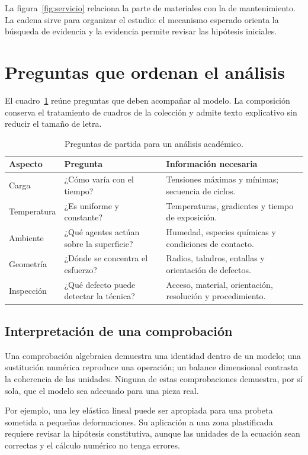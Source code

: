 La figura~\ref{fig:servicio} relaciona la parte de materiales con la de mantenimiento. La cadena sirve para organizar el estudio: el mecanismo esperado orienta la búsqueda de evidencia y la evidencia permite revisar las hipótesis iniciales.

\clearpage
\section{Preguntas que ordenan el análisis}
El cuadro~\ref{tab:preguntas} reúne preguntas que deben acompañar al modelo. La composición conserva el tratamiento de cuadros de la colección y admite texto explicativo sin reducir el tamaño de letra.

\begin{table}[htbp]
\centering\small
\caption{Preguntas de partida para un análisis académico.}\label{tab:preguntas}
\begin{tabular}{p{.23\linewidth}p{.31\linewidth}p{.35\linewidth}}
\toprule
Aspecto & Pregunta & Información necesaria\\
\midrule
Carga & ¿Cómo varía con el tiempo? & Tensiones máximas y mínimas; secuencia de ciclos.\\[4pt]
Temperatura & ¿Es uniforme y constante? & Temperaturas, gradientes y tiempo de exposición.\\[4pt]
Ambiente & ¿Qué agentes actúan sobre la superficie? & Humedad, especies químicas y condiciones de contacto.\\[4pt]
Geometría & ¿Dónde se concentra el esfuerzo? & Radios, taladros, entallas y orientación de defectos.\\[4pt]
Inspección & ¿Qué defecto puede detectar la técnica? & Acceso, material, orientación, resolución y procedimiento.\\
\bottomrule
\end{tabular}
\end{table}

\subsection{Interpretación de una comprobación}
Una comprobación algebraica demuestra una identidad dentro de un modelo; una sustitución numérica reproduce una operación; un balance dimensional contrasta la coherencia de las unidades. Ninguna de estas comprobaciones demuestra, por sí sola, que el modelo sea adecuado para una pieza real.

Por ejemplo, una ley elástica lineal puede ser apropiada para una probeta sometida a pequeñas deformaciones. Su aplicación a una zona plastificada requiere revisar la hipótesis constitutiva, aunque las unidades de la ecuación sean correctas y el cálculo numérico no tenga errores.

